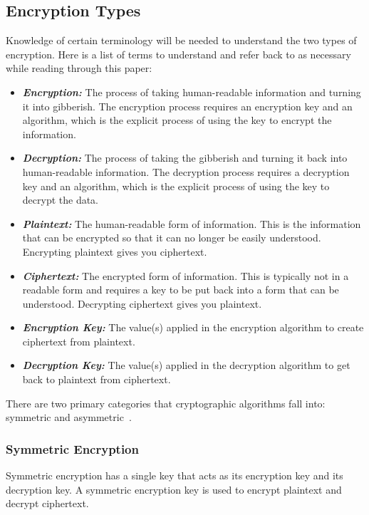 \documentclass{IEEEtran}
\begin{document}
\subsection{Encryption Types}\label{encryption}
Knowledge of certain terminology will be needed to understand the two types of encryption. Here is a list of terms to understand and refer back to as necessary while reading through this paper:
\begin{itemize}
    \item \textbf{\textit{Encryption:}} The process of taking human-readable information and turning it into gibberish. The encryption process requires an encryption key and an algorithm, which is the explicit process of using the key to encrypt the information.
    \item \textbf{\textit{Decryption:}} The process of taking the gibberish and turning it back into human-readable information. The decryption process requires a decryption key and an algorithm, which is the explicit process of using the key to decrypt the data.
    \item \textbf{\textit{Plaintext:}} The human-readable form of information. This is the information that can be encrypted so that it can no longer be easily understood. Encrypting plaintext gives you ciphertext.
    \item \textbf{\textit{Ciphertext:}} The encrypted form of information. This is typically not in a readable form and requires a key to be put back into a form that can be understood. Decrypting ciphertext gives you plaintext.
    \item \textbf{\textit{Encryption Key:}} The value(s) applied in the encryption algorithm to create ciphertext from plaintext.
    \item \textbf{\textit{Decryption Key:}} The value(s) applied in the decryption algorithm to get back to plaintext from ciphertext.
\end{itemize}

There are two primary categories that cryptographic algorithms fall into: symmetric and asymmetric~\cite{RN20}. \hfill \break

\subsubsection{Symmetric Encryption}\label{symenc}
Symmetric encryption has a single key that acts as its encryption key and its decryption key. A symmetric encryption key is used to encrypt plaintext and decrypt ciphertext. 
\end{document}
